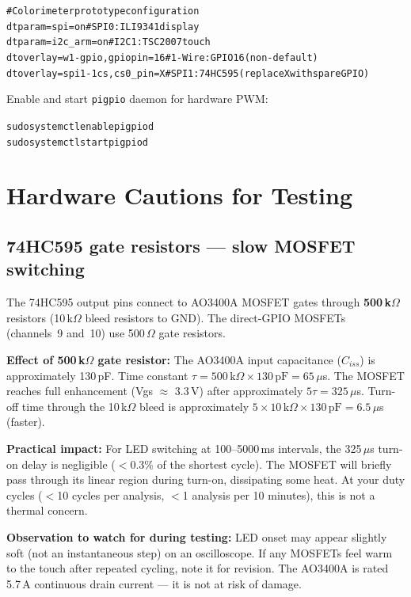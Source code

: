 \documentclass[11pt,a4paper]{article}
\begin{document}
\begin{alltt}\small
# Colorimeter prototype configuration
dtparam=spi=on                        # SPI0: ILI9341 display
dtparam=i2c_arm=on                    # I2C1: TSC2007 touch
dtoverlay=w1-gpio,gpiopin=16          # 1-Wire: GPIO16 (non-default)
dtoverlay=spi1-1cs,cs0_pin=X         # SPI1: 74HC595 (replace X with spare GPIO)
\end{alltt}

Enable and start \texttt{pigpio} daemon for hardware PWM:
\begin{alltt}\small
sudo systemctl enable pigpiod
sudo systemctl start pigpiod
\end{alltt}

\section{Hardware Cautions for Testing}
\label{sec:cautions}

\subsection{74HC595 gate resistors --- slow MOSFET switching}
\label{sec:mosfet}

\begin{notebox}
The 74HC595 output pins connect to AO3400A MOSFET gates through
\textbf{500\,k$\Omega$} resistors (10\,k$\Omega$ bleed resistors to GND).
The direct-GPIO MOSFETs (channels~9 and~10) use 500\,$\Omega$ gate resistors.

\smallskip
\textbf{Effect of 500\,k$\Omega$ gate resistor:}
The AO3400A input capacitance ($C_{iss}$) is approximately 130\,pF.
Time constant $\tau = 500\,\text{k}\Omega \times 130\,\text{pF} = 65\,\mu$s.
The MOSFET reaches full enhancement (Vgs $\approx$ 3.3\,V) after approximately
$5\tau = 325\,\mu$s.
Turn-off time through the 10\,k$\Omega$ bleed is approximately
$5 \times 10\,\text{k}\Omega \times 130\,\text{pF} = 6.5\,\mu$s (faster).

\smallskip
\textbf{Practical impact:}
For LED switching at 100--5000\,ms intervals, the 325\,$\mu$s turn-on delay
is negligible ($<$0.3\% of the shortest cycle).
The MOSFET will briefly pass through its linear region during turn-on,
dissipating some heat.
At your duty cycles ($<$10 cycles per analysis, $<$1 analysis per 10 minutes),
this is not a thermal concern.

\smallskip
\textbf{Observation to watch for during testing:}
LED onset may appear slightly soft (not an instantaneous step) on an oscilloscope.
If any MOSFETs feel warm to the touch after repeated cycling, note it for revision.
The AO3400A is rated 5.7\,A continuous drain current --- it is not at risk of damage.
\end{notebox}
\end{document}
